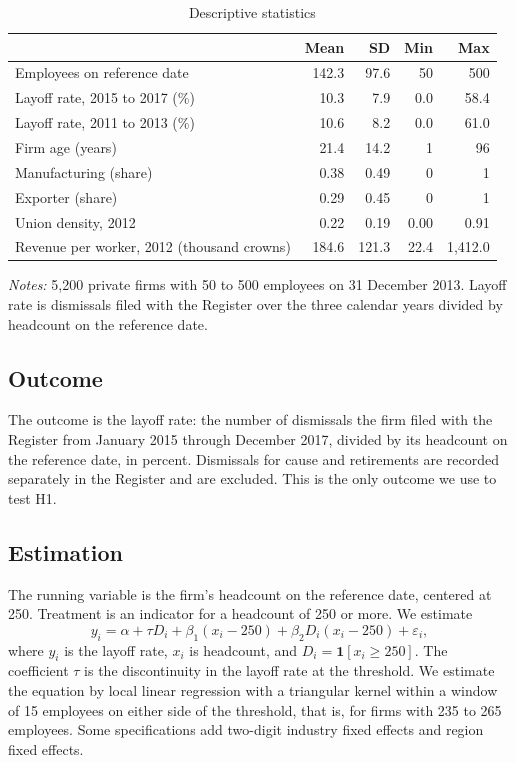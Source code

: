 \documentclass[12pt]{article}
\begin{document}
\begin{table}[htbp]
\centering
\begin{threeparttable}
\caption{Descriptive statistics}
\begin{tabular}{lrrrr}
\toprule
 & Mean & SD & Min & Max \\
\midrule
Employees on reference date & 142.3 & 97.6 & 50 & 500 \\
Layoff rate, 2015 to 2017 (\%) & 10.3 & 7.9 & 0.0 & 58.4 \\
Layoff rate, 2011 to 2013 (\%) & 10.6 & 8.2 & 0.0 & 61.0 \\
Firm age (years) & 21.4 & 14.2 & 1 & 96 \\
Manufacturing (share) & 0.38 & 0.49 & 0 & 1 \\
Exporter (share) & 0.29 & 0.45 & 0 & 1 \\
Union density, 2012 & 0.22 & 0.19 & 0.00 & 0.91 \\
Revenue per worker, 2012 (thousand crowns) & 184.6 & 121.3 & 22.4 & 1,412.0 \\
\bottomrule
\end{tabular}
\begin{tablenotes}\footnotesize
\item \emph{Notes:} 5,200 private firms with 50 to 500 employees on 31 December 2013. Layoff rate is dismissals filed with the Register over the three calendar years divided by headcount on the reference date.
\end{tablenotes}
\end{threeparttable}
\end{table}

\subsection{Outcome}

The outcome is the layoff rate: the number of dismissals the firm filed with the Register from January 2015 through December 2017, divided by its headcount on the reference date, in percent. Dismissals for cause and retirements are recorded separately in the Register and are excluded. This is the only outcome we use to test H1.

\subsection{Estimation}

The running variable is the firm's headcount on the reference date, centered at 250. Treatment is an indicator for a headcount of 250 or more. We estimate
\begin{equation}
y_i = \alpha + \tau D_i + \beta_1 (x_i - 250) + \beta_2 D_i (x_i - 250) + \varepsilon_i,
\end{equation}
where $y_i$ is the layoff rate, $x_i$ is headcount, and $D_i = \mathbf{1}[x_i \geq 250]$. The coefficient $\tau$ is the discontinuity in the layoff rate at the threshold. We estimate the equation by local linear regression with a triangular kernel within a window of 15 employees on either side of the threshold, that is, for firms with 235 to 265 employees. Some specifications add two-digit industry fixed effects and region fixed effects.
\end{document}
